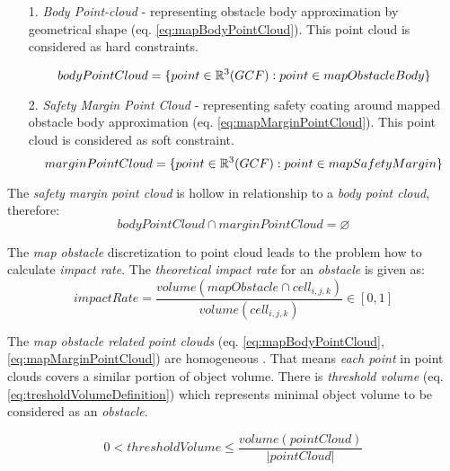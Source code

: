 \begin{itemize}
    \item[1.]\emph{Body Point-cloud} - representing obstacle body approximation by geometrical shape (eq. \ref{eq:mapBodyPointCloud}). This point cloud is considered as hard constraints.
    
    \begin{equation}\label{eq:mapBodyPointCloud}
        body Point Cloud  =\{point\in\mathbb{R}^3(GCF): point \in map Obstacle Body\}
    \end{equation}
    
    \item[2.]\emph{Safety Margin Point Cloud} - representing safety coating around mapped obstacle body approximation (eq. \ref{eq:mapMarginPointCloud}). This point cloud is considered as soft constraint.
    \begin{equation}\label{eq:mapMarginPointCloud}
        margin Point Cloud = \{point\in\mathbb{R}^3(GCF): point \in map Safety Margin\}
    \end{equation}
\end{itemize}

\begin{note}
    The \emph{safety margin point cloud} is hollow in relationship to a \emph{body point cloud}, therefore:
    \begin{equation*}
        body Point Cloud \cap margin Point Cloud  = \varnothing
    \end{equation*}
\end{note}

\noindent The \emph{map obstacle} discretization to point cloud leads to the problem how to calculate \emph{impact rate}. The \emph{theoretical impact rate} for an \emph{obstacle} is given as:
\begin{equation*}
    impact Rate = \frac{volume(map Obstacle\cap cell_{i,j,k})}{volume(cell_{i,j,k})}\in [0,1]
\end{equation*}

\noindent The \emph{map obstacle related point clouds} (eq. \ref{eq:mapBodyPointCloud}, \ref{eq:mapMarginPointCloud}) are homogeneous \cite{cernamaria2018}. That means \emph{each point} in point clouds covers a similar portion of object volume. There is \emph{threshold volume} (eq. \ref{eq:tresholdVolumeDefinition}) which represents minimal object volume to be considered as an \emph{obstacle}.

\begin{equation}\label{eq:tresholdVolumeDefinition}
    0< threshold Volume \le \frac{volume(point Cloud)}{|point Cloud|}
\end{equation}

